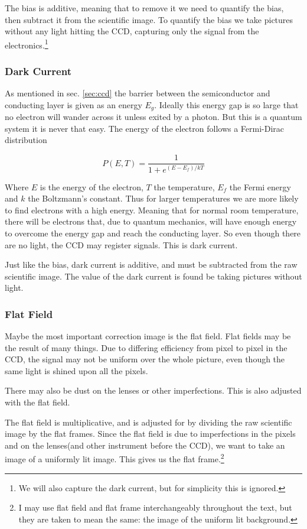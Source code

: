 \documentclass{emulateapj}
\begin{document}
The bias is additive, meaning that to remove it we need to quantify  the bias, then subtract it from the scientific image. To quantify the bias we take pictures without any light hitting the CCD, capturing only the signal from the electronics.\footnote{We will also capture the dark current, but for simplicity this is ignored.}

\subsubsection{Dark Current}
As mentioned in sec. \ref{sec:ccd} the barrier between the semiconductor and conducting layer is given as an energy $E_g$. Ideally this energy gap is so large that no electron will wander across it unless exited by a photon. But this is a quantum system it is never that easy. The energy of the electron follows a Fermi-Dirac distribution \citep{wiki:fermi}

\begin{equation}
P(E,T) = \frac{1}{1 + e^{(E-E_f)/kT}}
\end{equation}

Where $E$ is the energy of the electron, $T$ the temperature, $E_f$ the Fermi energy and $k$ the Boltzmann's constant. Thus for larger temperatures we are more likely to find electrons with a high energy. Meaning that for normal room temperature, there will be electrons that, due to quantum mechanics, will have enough energy to overcome the energy gap and reach the conducting layer. So even though there are no light, the CCD may register signals. This is dark current.

Just like the bias, dark current is additive, and must be subtracted from the raw scientific image. The value of the dark current is found be taking pictures without light.

\subsubsection{Flat Field}
Maybe the most important correction image is the flat field. Flat fields may be the result of many things. Due to differing efficiency from pixel to pixel in the CCD, the signal may not be uniform over the whole picture, even though the same light is shined upon all the pixels. 

There may also be dust on the lenses or other imperfections. This is also adjusted with the flat field.

The flat field is multiplicative, and is adjusted for by dividing the raw scientific image by the flat frames. Since the flat field is due to imperfections in the pixels and on the lenses(and other instrument before the CCD), we want to take an image of a uniformly lit image. This gives us the flat frame.\footnote{I may use flat field and flat frame interchangeably throughout the text, but they are taken to mean the same: the image of the uniform lit background.}
\end{document}
